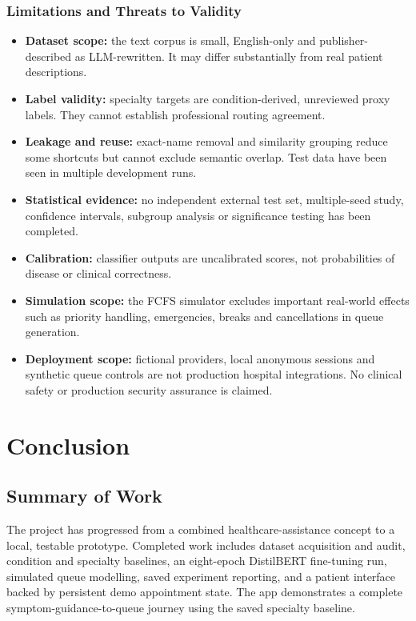 \documentclass{tietreport}
\begin{document}
\subsection{Limitations and Threats to Validity}
\begin{itemize}
\item \textbf{Dataset scope:} the text corpus is small, English-only and publisher-described as LLM-rewritten. It may differ substantially from real patient descriptions.
\item \textbf{Label validity:} specialty targets are condition-derived, unreviewed proxy labels. They cannot establish professional routing agreement.
\item \textbf{Leakage and reuse:} exact-name removal and similarity grouping reduce some shortcuts but cannot exclude semantic overlap. Test data have been seen in multiple development runs.
\item \textbf{Statistical evidence:} no independent external test set, multiple-seed study, confidence intervals, subgroup analysis or significance testing has been completed.
\item \textbf{Calibration:} classifier outputs are uncalibrated scores, not probabilities of disease or clinical correctness.
\item \textbf{Simulation scope:} the FCFS simulator excludes important real-world effects such as priority handling, emergencies, breaks and cancellations in queue generation.
\item \textbf{Deployment scope:} fictional providers, local anonymous sessions and synthetic queue controls are not production hospital integrations. No clinical safety or production security assurance is claimed.
\end{itemize}

\chapter{Conclusion}
\section{Summary of Work}
The project has progressed from a combined healthcare-assistance concept to a local, testable prototype. Completed work includes dataset acquisition and audit, condition and specialty baselines, an eight-epoch DistilBERT fine-tuning run, simulated queue modelling, saved experiment reporting, and a patient interface backed by persistent demo appointment state. The app demonstrates a complete symptom-guidance-to-queue journey using the saved specialty baseline.
\end{document}
